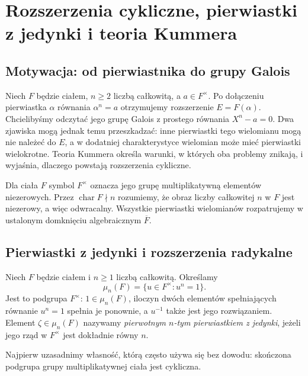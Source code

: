 \chapter[Rozszerzenia cykliczne i teoria Kummera]{Rozszerzenia cykliczne, pierwiastki z jedynki i teoria Kummera}
\label{aa:ch:kummer}

\section{Motywacja: od pierwiastnika do grupy Galois}
Niech $F$ będzie ciałem, $n\geq2$ liczbą całkowitą, a $a\in F^\times$.
Po dołączeniu pierwiastka $\alpha$ równania $\alpha^n=a$
otrzymujemy rozszerzenie $E=F(\alpha)$. Chcielibyśmy odczytać
jego grupę Galois z prostego równania $X^n-a=0$.
Dwa zjawiska mogą jednak temu przeszkadzać: inne pierwiastki
tego wielomianu mogą nie należeć do $E$, a w dodatniej
charakterystyce wielomian może mieć pierwiastki wielokrotne.
Teoria Kummera określa warunki, w których oba problemy znikają,
i wyjaśnia, dlaczego powstają rozszerzenia cykliczne.

Dla ciała $F$ symbol $F^\times$ oznacza jego grupę
multiplikatywną elementów niezerowych. Przez
$\operatorname{char}F\nmid n$ rozumiemy, że obraz liczby całkowitej
$n$ w $F$ jest niezerowy, a więc odwracalny.
Wszystkie pierwiastki wielomianów rozpatrujemy w ustalonym
domknięciu algebraicznym $\overline F$.

\section{Pierwiastki z jedynki i rozszerzenia radykalne}
\begin{definicja}\label{aa:def:mu-n}
Niech $F$ będzie ciałem i $n\geq1$ liczbą całkowitą. Określamy
\[
\mu_n(F)=\{u\in F^\times:u^n=1\}.
\]
Jest to podgrupa $F^\times$: $1\in\mu_n(F)$, iloczyn
dwóch elementów spełniających równanie $u^n=1$
spełnia je ponownie, a $u^{-1}$ także jest jego rozwiązaniem.
Element $\zeta\in\mu_n(F)$ nazywamy
\emph{pierwotnym $n$-tym pierwiastkiem z jedynki},
jeżeli jego rząd w $F^\times$ jest dokładnie równy $n$.
\end{definicja}

Najpierw uzasadnimy własność, którą często używa się bez dowodu:
skończona podgrupa grupy multiplikatywnej ciała jest cykliczna.

